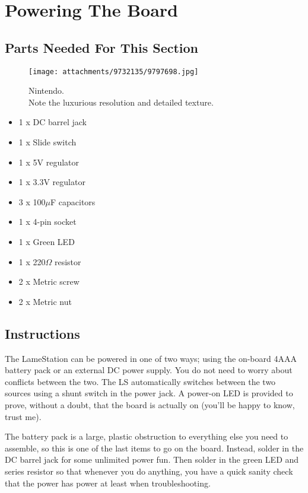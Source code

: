 \section{Powering The Board}
\subsection{Parts Needed For This Section}

\begin{figure}[H]
		\centering
    \texttt{[image: attachments/9732135/9797698.jpg]}\\
    \label{fig:zeldatwilight}
    \caption{ Nintendo. \\ Note the luxurious resolution and detailed texture.}
\end{figure}

\begin{itemize}
\item
  1 x DC barrel jack
\item
  1 x Slide switch
\item
  1 x 5V regulator
\item
  1 x 3.3V regulator
\item
  3 x 100$\mu$F capacitors
\item
  1 x 4-pin socket
\item
  1 x Green LED
\item
  1 x 220$\Omega$ resistor
\item
  2 x Metric screw
\item
  2 x Metric nut
\end{itemize}

\subsection{Instructions}

The LameStation can be powered in one of two ways; using the on-board
4AAA battery pack or an external DC power supply. You do not need to
worry about conflicts between the two. The LS automatically switches
between the two sources using a shunt switch in the power jack. A
power-on LED is provided to prove, without a doubt, that the board is
actually on (you'll be happy to know, trust me).

The battery pack is a large, plastic obstruction to everything else you
need to assemble, so this is one of the last items to go on the board.
Instead, solder in the DC barrel jack for some unlimited power fun. Then
solder in the green LED and series resistor so that whenever you do
anything, you have a quick sanity check that the power has power at
least when troubleshooting.

